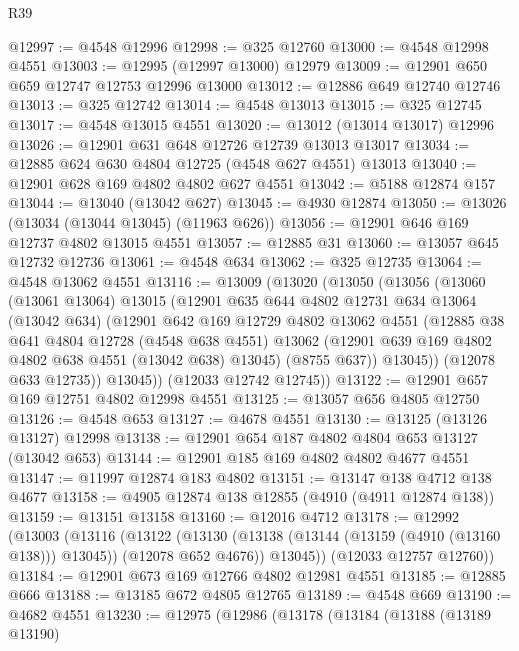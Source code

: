 \begin{lexlean}{R39}
\begin{coremodule}
@12997 := @4548 @12996
@12998 := @325 @12760
@13000 := @4548 @12998 @4551
@13003 := @12995 (@12997 @13000) @12979
@13009 := @12901 @650 @659 @12747 @12753 @12996 @13000
@13012 := @12886 @649 @12740 @12746
@13013 := @325 @12742
@13014 := @4548 @13013
@13015 := @325 @12745
@13017 := @4548 @13015 @4551
@13020 := @13012 (@13014 @13017) @12996
@13026 := @12901 @631 @648 @12726 @12739 @13013 @13017
@13034 := @12885 @624 @630 @4804 @12725 (@4548 @627 @4551) @13013
@13040 := @12901 @628 @169 @4802 @4802 @627 @4551
@13042 := @5188 @12874 @157
@13044 := @13040 (@13042 @627)
@13045 := @4930 @12874
@13050 := @13026 (@13034 (@13044 @13045) (@11963 @626))
@13056 := @12901 @646 @169 @12737 @4802 @13015 @4551
@13057 := @12885 @31
@13060 := @13057 @645 @12732 @12736
@13061 := @4548 @634
@13062 := @325 @12735
@13064 := @4548 @13062 @4551
@13116 := @13009
    (@13020
      (@13050
        (@13056
          (@13060
            (@13061 @13064)
            @13015
            (@12901
              @635
              @644
              @4802
              @12731
              @634
              @13064
              (@13042 @634)
              (@12901
                @642
                @169
                @12729
                @4802
                @13062
                @4551
                (@12885
                  @38
                  @641
                  @4804
                  @12728
                  (@4548 @638 @4551)
                  @13062
                  (@12901 @639 @169 @4802 @4802 @638 @4551 (@13042 @638) @13045)
                  (@8755 @637))
                @13045))
            (@12078 @633 @12735))
          @13045))
      (@12033 @12742 @12745))
@13122 := @12901 @657 @169 @12751 @4802 @12998 @4551
@13125 := @13057 @656 @4805 @12750
@13126 := @4548 @653
@13127 := @4678 @4551
@13130 := @13125 (@13126 @13127) @12998
@13138 := @12901 @654 @187 @4802 @4804 @653 @13127 (@13042 @653)
@13144 := @12901 @185 @169 @4802 @4802 @4677 @4551
@13147 := @11997 @12874 @183 @4802
@13151 := @13147 @138 @4712 @138 @4677
@13158 := @4905 @12874 @138 @12855 (@4910 (@4911 @12874 @138))
@13159 := @13151 @13158
@13160 := @12016 @4712
@13178 := @12992
    (@13003
      (@13116
        (@13122
          (@13130 (@13138 (@13144 (@13159 (@4910 (@13160 @138))) @13045)) (@12078 @652 @4676))
          @13045))
      (@12033 @12757 @12760))
@13184 := @12901 @673 @169 @12766 @4802 @12981 @4551
@13185 := @12885 @666
@13188 := @13185 @672 @4805 @12765
@13189 := @4548 @669
@13190 := @4682 @4551
@13230 := @12975
    (@12986
      (@13178
        (@13184
          (@13188
            (@13189 @13190)

\end{coremodule}
\end{lexlean}
